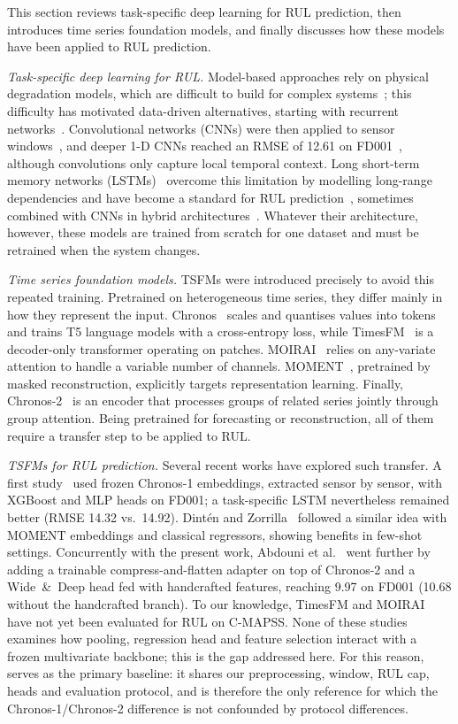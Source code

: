\documentclass{svproc}
\begin{document}
This section reviews task-specific deep learning for RUL prediction, then
introduces time series foundation models, and finally discusses how
these models have been applied to RUL prediction.

\textit{Task-specific deep learning for RUL.} Model-based approaches rely
on physical degradation models, which are difficult to build for complex
systems~\cite{khan2018}; this difficulty has motivated data-driven
alternatives, starting with recurrent networks~\cite{heimes_recurrent_2008}.
Convolutional networks (CNNs) were then applied to sensor
windows~\cite{babu2016}, and deeper 1-D CNNs reached an RMSE of 12.61 on
FD001~\cite{li2018}, although convolutions only capture local temporal
context. Long short-term memory networks (LSTMs)~\cite{hochreiter1997}
overcome this limitation by modelling long-range dependencies and have
become a standard for RUL prediction~\cite{zheng2017}, sometimes combined
with CNNs in hybrid architectures~\cite{zhao2020}. Whatever their
architecture, however, these models are trained from scratch for one
dataset and must be retrained when the system changes.

\textit{Time series foundation models.} TSFMs were introduced precisely
to avoid this repeated training. Pretrained on heterogeneous time series,
they differ mainly in how they represent the input. Chronos~\cite{chronos2024} scales and quantises values into tokens
and trains T5 language models with a cross-entropy loss, while
TimesFM~\cite{das2024timesfm} is a decoder-only transformer operating on
patches. MOIRAI~\cite{woo2024moirai} relies on any-variate attention to
handle a variable number of channels. MOMENT~\cite{goswami2024moment}, pretrained by masked
reconstruction, explicitly targets representation learning. Finally,
Chronos-2~\cite{chronos2_2025} is an encoder that processes groups of
related series jointly through group attention. Being pretrained for forecasting or reconstruction, all of them require
a transfer step to be applied to RUL.

\textit{TSFMs for RUL prediction.} Several recent works have explored
such transfer. A first study~\cite{imsa2025} used frozen Chronos-1
embeddings, extracted sensor by sensor, with XGBoost and MLP heads on
FD001; a task-specific LSTM nevertheless remained better (RMSE 14.32 vs.\
14.92). Dint\'en and Zorrilla~\cite{dinten2025} followed a similar idea
with MOMENT embeddings and classical regressors, showing benefits in
few-shot settings. Concurrently with the present work, Abdouni et
al.~\cite{abdouni2026} went further by adding a trainable
compress-and-flatten adapter on top of Chronos-2 and a Wide~\&~Deep head
fed with handcrafted features, reaching 9.97 on FD001 (10.68 without the
handcrafted branch). To our knowledge, TimesFM and MOIRAI
have not yet been evaluated for RUL on C-MAPSS. None of these studies examines how pooling, regression
head and feature selection interact with a frozen multivariate backbone;
this is the gap addressed here. For this reason, \cite{imsa2025} serves
as the primary baseline: it shares our preprocessing, window, RUL cap,
heads and evaluation protocol, and is therefore the only reference for
which the Chronos-1/Chronos-2 difference is not confounded by protocol
differences.
\end{document}
